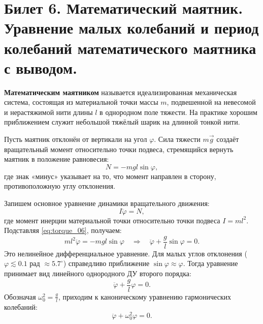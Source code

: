 \section{Билет 6. Математический маятник. Уравнение малых колебаний и период колебаний математического маятника с выводом.}

\begin{definition}
\textbf{Математическим маятником} называется идеализированная механическая система, состоящая из материальной точки массы $m$, подвешенной на невесомой и нерастяжимой нити длины $l$ в однородном поле тяжести. На практике хорошим приближением служит небольшой тяжёлый шарик на длинной тонкой нити.
\end{definition}

\begin{theorem}
Пусть маятник отклонён от вертикали на угол $\varphi$. Сила тяжести $m\vec{g}$ создаёт вращательный момент относительно точки подвеса, стремящийся вернуть маятник в положение равновесия:
\begin{equation}
    N = -mgl \sin\varphi, \label{eq:torque_06}
\end{equation}
где знак «минус» указывает на то, что момент направлен в сторону, противоположную углу отклонения.

Запишем основное уравнение динамики вращательного движения:
\begin{equation}
    I \ddot{\varphi} = N,
\end{equation}
где момент инерции материальной точки относительно точки подвеса $I = ml^2$. Подставляя \eqref{eq:torque_06}, получаем:
\begin{equation}
    ml^2 \ddot{\varphi} = -mgl \sin\varphi \quad \Rightarrow \quad \ddot{\varphi} + \frac{g}{l} \sin\varphi = 0. \label{eq:exact_pendulum}
\end{equation}
Это нелинейное дифференциальное уравнение. Для малых углов отклонения ($\varphi \lesssim 0.1$ рад $\approx 5.7^\circ$) справедливо приближение $\sin\varphi \approx \varphi$. Тогда уравнение принимает вид линейного однородного ДУ второго порядка:
\begin{equation}
    \ddot{\varphi} + \frac{g}{l} \varphi = 0. \label{eq:small_pendulum}
\end{equation}
Обозначая $\omega_0^2 = \frac{g}{l}$, приходим к каноническому уравнению гармонических колебаний:
\begin{equation}
    \ddot{\varphi} + \omega_0^2 \varphi = 0.
\end{equation}
\end{theorem}

